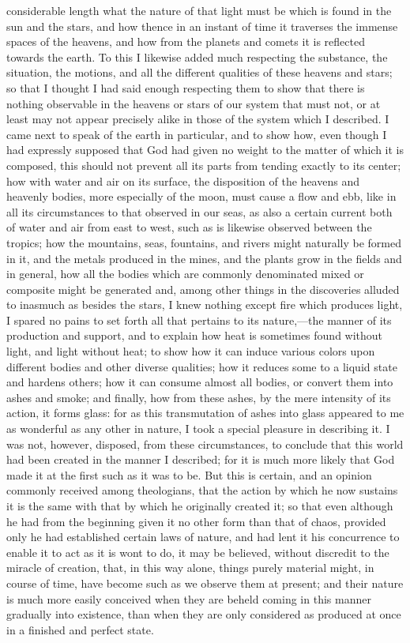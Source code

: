 \documentclass[12pt]{article}
\begin{document}
considerable length what the nature of that light must be which is found in the sun and the stars, and how thence in an instant of time it traverses the immense spaces of the heavens, and how from the planets and comets it is reflected towards the earth. To this I likewise added much respecting the substance, the situation, the motions, and all the different qualities of these heavens and stars; so that I thought I had said enough respecting them to show that there is nothing observable in the heavens or stars of our system that must not, or at least may not appear precisely alike in those of the system which I described. I came next to speak of the earth in particular, and to show how, even though I had expressly supposed that God had given no weight to the matter of which it is composed, this should not prevent all its parts from tending exactly to its center; how with water and air on its surface, the disposition of the heavens and heavenly bodies, more especially of the moon, must cause a flow and ebb, like in all its circumstances to that observed in our seas, as also a certain current both of water and air from east to west, such as is likewise observed between the tropics; how the mountains, seas, fountains, and rivers might naturally be formed in it, and the metals produced in the mines, and the plants grow in the fields and in general, how all the bodies which are commonly denominated mixed or composite might be generated and, among other things in the discoveries alluded to inasmuch as besides the stars, I knew nothing except fire which produces light, I spared no pains to set forth all that pertains to its nature,---the manner of its production and support, and to explain how heat is sometimes found without light, and light without heat; to show how it can induce various colors upon different bodies and other diverse qualities; how it reduces some to a liquid state and hardens others; how it can consume almost all bodies, or convert them into ashes and smoke; and finally, how from these ashes, by the mere intensity of its action, it forms glass: for as this transmutation of ashes into glass appeared to me as wonderful as any other in nature, I took a special pleasure in describing it. I was not, however, disposed, from these circumstances, to conclude that this world had been created in the manner I described; for it is much more likely that God made it at the first such as it was to be. But this is certain, and an opinion commonly received among theologians, that the action by which he now sustains it is the same with that by which he originally created it; so that even although he had from the beginning given it no other form than that of chaos, provided only he had established certain laws of nature, and had lent it his concurrence to enable it to act as it is wont to do, it may be believed, without discredit to the miracle of creation, that, in this way alone, things purely material might, in course of time, have become such as we observe them at present; and their nature is much more easily conceived when they are beheld coming in this manner gradually into existence, than when they are only considered as produced at once in a finished and perfect state.
\end{document}
